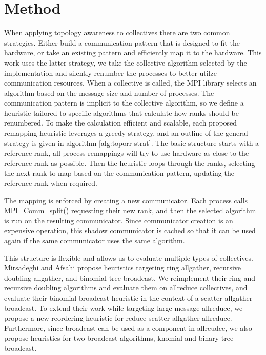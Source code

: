 \section{Method}
When applying topology awareness to collectives there are two common strategies.
Either build a communication pattern that is designed to fit the hardware, or take an existing pattern and efficiently map it to the hardware.
This work uses the latter strategy, we take the collective algorithm selected by the implementation and silently renumber the processes to better utilze communication resources.
When a collective is called, the MPI library selects an algorithm based on the message size and number of processes.
The communication pattern is implicit to the collective algorithm, so we define a heuristic tailored to specific algorithms that calculate how ranks should be renumbered.
To make the calculation efficient and scalable, each proposed remapping heuristic leverages a greedy strategy, and an outline of the general strategy is given in algorithm \ref{alg:toporr-strat}.
The basic structure starts with a reference rank, all process remappings will try to use hardware as close to the reference rank as possible.
Then the heuristic loops through the ranks, selecting the next rank to map based on the communication pattern, updating the reference rank when required.

The mapping is enforced by creating a new communicator.
Each process calls MPI\_Comm\_split() requesting their new rank, and then the selected algorithm is run on the resulting communicator.
Since communicator creation is an expensive operation, this shadow communicator is cached so that it can be used again if the same communicator uses the same algorithm.

This structure is flexible and allows us to evaluate multiple types of collectives.
Mirsadeghi and Afsahi \cite{Mirsadeghi2016TopoAwareCollRR} propose heuristics targeting ring allgather, recursive doubling allgather, and binomial tree broadcast. 
We reimplement their ring and recursive doubling algorithms and evaluate them on allreduce collectives, and evaluate their binomial-broadcast heuristic in the context of a scatter-allgather broadcast.
To extend their work while targeting large message allreduce, we propose a new reordering heuristic for reduce-scatter-allgather allreduce.
Furthermore, since broadcast can be used as a component in allreudce, we also propose heuristics for two broadcast algorithms, knomial and binary tree broadcast.

% 


